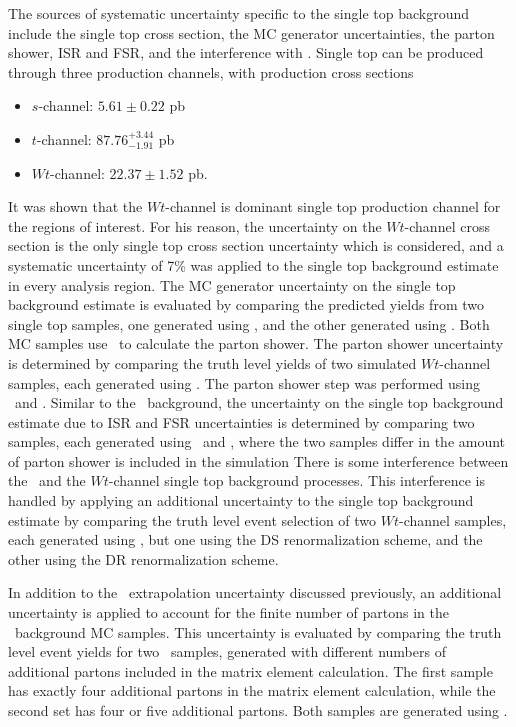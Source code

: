 The sources of systematic uncertainty specific to the single top background
include the single top cross section, the MC generator uncertainties, the parton
shower, ISR and FSR, and the interference with \TTBAR.
Single top can be produced through three production channels, with production
cross sections
\begin{itemize}
  \item $s$-channel: $5.61 \pm 0.22$ pb
  \item $t$-channel: $87.76^{+3.44}_{-1.91}$ pb
  \item $Wt$-channel: $22.37 \pm 1.52$ pb.
\end{itemize}
It was shown that the $Wt$-channel is dominant single top production channel for
the regions of interest.
For his reason, the uncertainty on the $Wt$-channel cross section is the only
single top cross section uncertainty which is considered, and a systematic
uncertainty of 7\% was applied to the single top background estimate in every
analysis region.
The MC generator uncertainty on the single top background estimate is evaluated
by comparing the predicted yields from two single top samples, one generated
using \powheg, and the other generated using \mcnlo.
Both MC samples use \herwig\ to calculate the parton shower.
The parton shower uncertainty is determined by comparing the truth level yields
of two simulated $Wt$-channel samples, each generated using \herwig.
The parton shower step was performed using \pythia\ and \herwig.
Similar to the \TTBAR\ background, the uncertainty on the single top background
estimate due to ISR and FSR uncertainties is determined by comparing two
samples, each generated using \acermc\ and \pythia, where the two samples
differ in the amount of parton shower is included in the simulation
There is some interference between the \TTBAR\ and the $Wt$-channel single top
background processes.
This interference is handled by applying an additional uncertainty to the single
top background estimate by comparing the truth level event selection of two
$Wt$-channel samples, each generated using \powheg, but one using the DS
renormalization scheme, and the other using the DR renormalization scheme.

In addition to the \HT\ extrapolation uncertainty discussed previously, an
additional uncertainty is applied to account for the finite number of partons in
the \ZGAMMAJETS\ background MC samples.
This uncertainty is evaluated by comparing the truth level event yields for two
\ZGAMMAJETS\ samples, generated with different numbers of additional partons
included in the matrix element calculation.
The first sample has exactly four additional partons in the matrix element
calculation, while the second set has four or five additional partons.
Both samples are generated using \sherpa.

